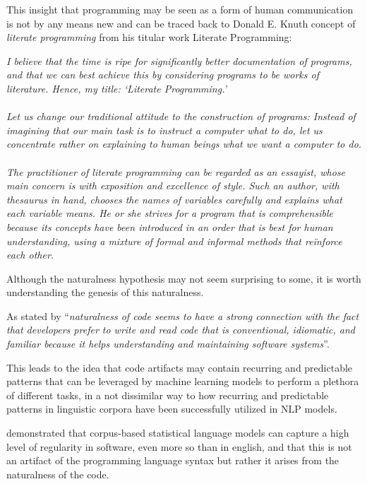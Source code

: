 This insight that programming may be seen as a form of human communication is not by any means new and can be traced back to Donald E. Knuth concept of \textit{literate programming} from his titular work Literate Programming:

\begin{myquote}
\textit{I believe that the time is ripe
for significantly better documentation of programs, and
that we can best achieve this by considering programs
to be works of literature. Hence, my title: `Literate
Programming.'}
\\
\\
\qquad\textit{ Let us change our traditional attitude to the construction of programs: Instead of imagining that our
main task is to instruct a computer what to do, let us
concentrate rather on explaining to human beings what
we want a computer to do.}
\\
\\
\qquad \textit{The practitioner of literate programming can be regarded as an essayist, whose main concern is with exposition and excellence of style. Such an author, with
thesaurus in hand, chooses the names of variables carefully and explains what each variable means. He or she strives for a program that is comprehensible because its
concepts have been introduced in an order that is best
for human understanding, using a mixture of formal
and informal methods that re{\"i}nforce each other. }\\\citet{knuth1984literate}\end{myquote}


Although the naturalness hypothesis may not seem surprising to some, it is worth understanding the genesis of this naturalness. 

As stated by \citet{allamanis2018survey} ``\textit{naturalness of code seems to have a strong connection with the fact that developers prefer to write \citep{Allamanis_2014} and read \citep{7180076} code that is conventional, idiomatic, and familiar because it helps understanding and maintaining software systems}''.

This leads to the idea that code artifacts may contain recurring and predictable patterns that can be leveraged by machine learning models to perform a plethora of different tasks, in a not dissimilar way to how recurring and predictable patterns in linguistic corpora have been successfully utilized in NLP models.

\citet{naturalidade_original} demonstrated that corpus-based statistical language models can capture a high level of regularity in software, even more so than in english, and that this is not an artifact of the programming language syntax but rather it arises from the naturalness of the code.

